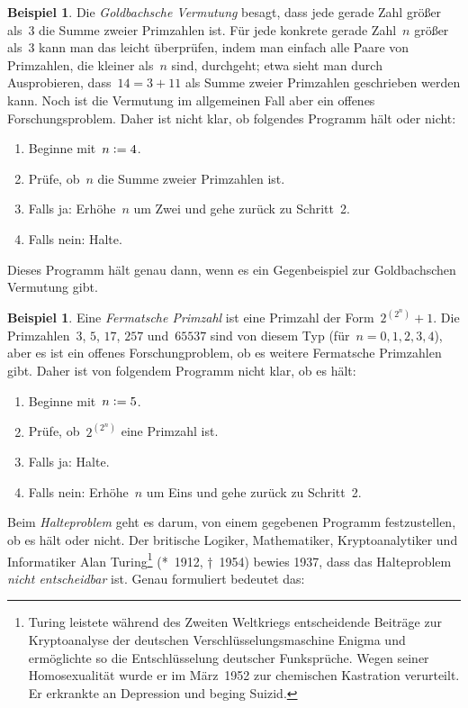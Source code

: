 \documentclass[twoside]{../zirkelblatt1415}
\theoremstyle{definition}
\newtheorem{bsp}[defn]{Beispiel}
\theoremstyle{plain}
\theoremstyle{remark}
\newenvironment{listing}{
  \renewcommand*\theenumi{\arabic{enumi}}
  \renewcommand{\labelenumi}{\theenumi.}
  \begin{enumerate}\itemsep0em}{\end{enumerate}}
\newcommand{\defeq}{\vcentcolon=}
\begin{document}
\begin{bsp}\label{bsp:unklares-programm1}Die \emph{Goldbachsche Vermutung}
besagt, dass jede gerade Zahl
größer als~3 die Summe zweier Primzahlen ist. Für jede
konkrete gerade Zahl~$n$ größer als~3 kann man das leicht überprüfen, indem man
einfach alle Paare von Primzahlen, die kleiner als~$n$ sind, durchgeht; etwa
sieht man durch Ausprobieren, dass~$14 = 3 + 11$ als Summe zweier Primzahlen
geschrieben werden kann. Noch ist die Vermutung im allgemeinen Fall aber ein
offenes Forschungsproblem. Daher ist nicht klar, ob folgendes Programm hält
oder nicht:
\begin{listing}
\item[1.] Beginne mit~$n \defeq 4$.
\item[2.] Prüfe, ob~$n$ die Summe zweier Primzahlen ist.
\item[3.] Falls ja: Erhöhe~$n$ um Zwei und gehe zurück zu Schritt~2.
\item[4.] Falls nein: Halte.
\end{listing}
Dieses Programm hält genau dann, wenn es ein Gegenbeispiel zur Goldbachschen
Vermutung gibt.
\end{bsp}

\begin{bsp}\label{bsp:unklares-programm2}Eine \emph{Fermatsche Primzahl} ist eine Primzahl der
Form~$2^{(2^n)} + 1$. Die Primzahlen~$3$, $5$, $17$, $257$ und~$65537$ sind von
diesem Typ (für~$n = 0,1,2,3,4$), aber es ist ein offenes Forschungproblem, ob
es weitere Fermatsche Primzahlen gibt. Daher ist von folgendem Programm nicht
klar, ob es hält:
\begin{listing}
\item[1.] Beginne mit~$n \defeq 5$.
\item[2.] Prüfe, ob~$2^{(2^n)}$ eine Primzahl ist.
\item[3.] Falls ja: Halte.
\item[4.] Falls nein: Erhöhe~$n$ um Eins und gehe zurück zu Schritt~2.
\end{listing}
\end{bsp}

Beim \emph{Halteproblem} geht es darum, von einem gegebenen Programm
festzustellen, ob es hält oder nicht. Der britische Logiker, Mathematiker,
Kryptoanalytiker und Informatiker Alan Turing\footnote{Turing leistete während des
Zweiten Weltkriegs entscheidende Beiträge zur Kryptoanalyse der
deutschen Verschlüsselungsmaschine Enigma und ermöglichte so die
Entschlüsselung deutscher Funksprüche. Wegen seiner Homosexualität wurde er
im März~1952 zur chemischen Kastration verurteilt. Er erkrankte an
Depression und beging Suizid.} (*~1912, †~1954) bewies 1937, dass das Halteproblem
\emph{nicht entscheidbar} ist. Genau formuliert bedeutet das:
\end{document}
